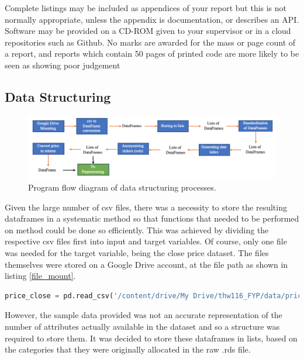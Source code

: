 \documentclass[10pt,onecolumn,letterpaper]{article}
\begin{document}
Complete listings may be included as appendices of your report but this is not normally appropriate, unless the appendix is documentation, or describes an API. Software may be provided on a CD-ROM given to your supervisor or in a cloud repositories such as Github. No marks are awarded for the mass or page count of a report, and reports which contain 50 pages of printed code are more likely to be seen as showing poor judgement
\fi

\subsection{Data Structuring}
 
\begin{figure}[!hbt!]
\centering
\includegraphics[width=\columnwidth]{data_structuring.png}
\caption{Program flow diagram of data structuring processes.}
\label{data_structuring}
\end{figure}
 
Given the large number of csv files, there was a necessity to store the resulting dataframes in a systematic method so that functions that needed to be performed on method could be done so efficiently. This was achieved by dividing the respective csv files first into input and target variables. Of course, only one file was needed for the target variable, being the close price dataset. The files themselves were stored on a Google Drive account, at the file path as shown in listing \ref{file_mount}. 

\begin{lstlisting}[language=Python, breaklines=true, label = {file_mount}, caption={Importing csv file to dataframe.}]
price_close = pd.read_csv('/content/drive/My Drive/thw116_FYP/data/price_close.csv')
\end{lstlisting}

However, the sample data provided was not an accurate representation of the number of attributes actually available in the dataset and so a structure was required to store them. It was decided to store these dataframes in lists, based on the categories that they were originally allocated in the raw .rds file. 
\end{document}

